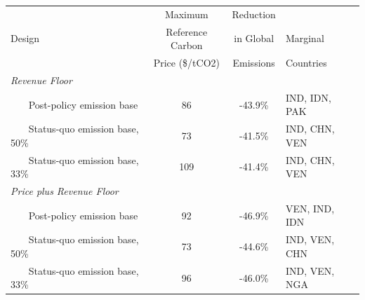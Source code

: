 \begin{center}
\small
\setlength{\tabcolsep}{4pt}
\renewcommand{\arraystretch}{1.25}
\begin{tabular}{l c c l}
\hline
 & Maximum & Reduction & \\
 Design & Reference Carbon &  in Global & Marginal \\
 & Price (\$/tCO2) &  Emissions & Countries \\
\hline
\multicolumn{4}{l}{\textit{Revenue Floor}} \\
 ~~~ Post-policy emission base & 86 & -43.9\% & IND, IDN, PAK \\
 ~~~ Status-quo emission base, 50\% & 73 & -41.5\% & IND, CHN, VEN \\
 ~~~ Status-quo emission base, 33\% & 109 & -41.4\% & IND, CHN, VEN \\
\multicolumn{4}{l}{\textit{Price plus Revenue Floor}} \\
 ~~~ Post-policy emission base & 92 & -46.9\% & VEN, IND, IDN \\
 ~~~ Status-quo emission base, 50\% & 73 & -44.6\% & IND, VEN, CHN \\
 ~~~ Status-quo emission base, 33\% & 96 & -46.0\% & IND, VEN, NGA \\
\hline
\end{tabular}
\end{center}
